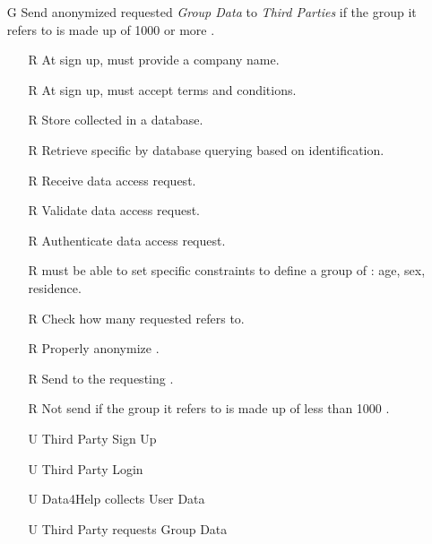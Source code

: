 \documentclass[../../../rasd.tex]{subfiles}
\begin{document}
\begin{itemize}
    \item[G\subs{3}]Send anonymized requested \textit{Group Data} to \textit{Third Parties} if the group it refers to is made up of 1000 or more .
    \begin{itemize}
            \item[R\subs{3}]At sign up,  must provide a company name.
            \item[R\subs{5}]At sign up,  must accept terms and conditions.
        \item[R\subs{11}]Store collected  in a database.
        \item[R\subs{12}]Retrieve specific  by database querying based on  identification.
        \item[R\subs{13}]Receive  data access request.
        \item[R\subs{14}]Validate  data access request.
        \item[R\subs{15}]Authenticate  data access request.
        \item[R\subs{21}] must be able to set specific constraints to define a group of : age, sex, residence.
        \item[R\subs{22}]Check how many  requested  refers to.
        \item[R\subs{23}]Properly anonymize .
        \item[R\subs{24}]Send  to the requesting .
        \item[R\subs{25}]Not send  if the group it refers to is made up of less than 1000 .
        \\
        \item[U\subs{2}]Third Party Sign Up
        \item[U\subs{4}]Third Party Login
        \item[U\subs{5}]Data4Help collects User Data
        \item[U\subs{7}]Third Party requests Group Data
    \end{itemize}


\end{itemize}
\end{document}
